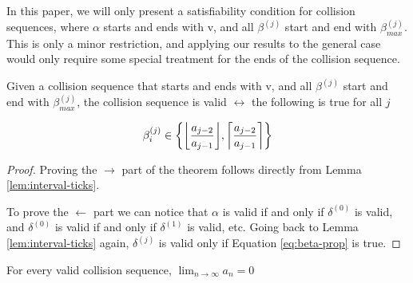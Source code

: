 
In this paper, we will only present a satisfiability condition for collision sequences, where $\alpha$ starts and ends with v, and all $\beta^{(j)}$ start and end with $\beta^{(j)}_{max}$. This is only a minor restriction, and applying our results to the general case would only require some special treatment for the ends of the collision sequence.


\begin{theorem}\label{thm:beta_i}
	Given a collision sequence that starts and ends with v, and all $\beta^{(j)}$ start and end with $\beta^{(j)}_{max}$, the collision sequence is valid $\leftrightarrow$ the following is true for all $j$

	\begin{equation}\label{eq:beta-prop}
		\beta^{(j)}_i \in \cbracket{\floor{\frac{a_{j-2}}{a_{j-1}}}, \ceil{\frac{a_{j-2}}{a_{j-1}}}}
	\end{equation}
\end{theorem}

\begin{proof}
	Proving the $\rightarrow$ part of the theorem follows directly from Lemma \ref{lem:interval-ticks}.

	To prove the $\leftarrow$ part we can notice that $\alpha$ is valid if and only if $\delta^{(0)}$ is valid, and $\delta^{(0)}$ is valid if and only if $\delta^{(1)}$ is valid, etc. Going back to Lemma \ref{lem:interval-ticks} again, $\delta^{(j)}$ is valid only if Equation \ref{eq:beta-prop} is true.
\end{proof}


\begin{theorem}
	For every valid collision sequence, ${\displaystyle \lim_{n \to \infty} a_n = 0}$
\end{theorem}

